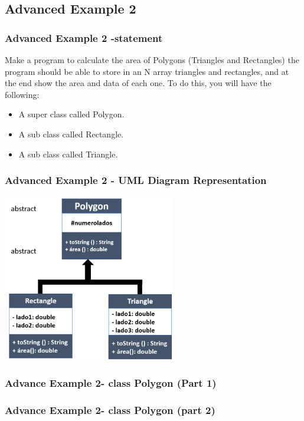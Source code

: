 \documentclass[11pt]{beamer}
\begin{document}
\begin{frame}
\section{Advanced Example 2}
\frametitle{Advanced Example 2 -statement}
Make a program to calculate the area of Polygons (Triangles and Rectangles) the program should be able to store in an N array triangles and rectangles, and at the end show the area and data of each one. To do this, you will have the following: 
\begin{itemize}
\item A super class called Polygon.
\item A sub class called Rectangle.
\item A sub class called Triangle.
\end{itemize}
\end{frame}
\begin{frame}
\frametitle{Advanced Example 2 - UML Diagram Representation}
\begin{center}
{\includegraphics[width=7.5cm]{img/UmlAdvanceExample2.png}}
\end{center}
\end{frame}

\begin{frame}
\frametitle{Advance Example 2- class Polygon (Part 1)}

\end{frame}

\begin{frame}
\frametitle{Advance Example 2- class Polygon (part 2)}

\end{frame}
\end{document}
